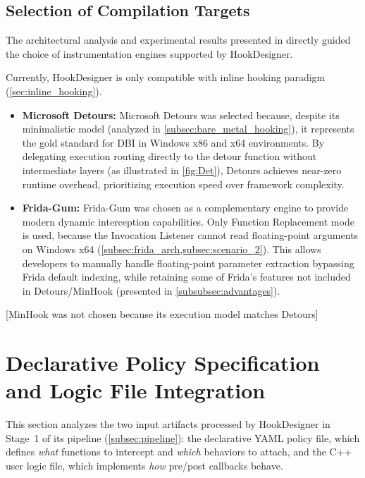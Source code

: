 \subsection{Selection of Compilation Targets}
\label{subsec:target_selection}

The architectural analysis and experimental results presented in  directly guided the choice of instrumentation engines supported by HookDesigner.

Currently, HookDesigner is only compatible with inline hooking paradigm (\cref{sec:inline_hooking}).

\begin{itemize}
	\item \textbf{Microsoft Detours:}
	Microsoft Detours was selected because, despite its minimalistic model (analyzed in \cref{subsec:bare_metal_hooking}), it represents the gold standard for \ac{DBI} in Windows x86 and x64 environments.
	By delegating execution routing directly to the detour function without intermediate layers (as illustrated in \cref{fig:Det}), Detours achieves near-zero runtime overhead, prioritizing execution speed over framework complexity. 
	
	\item \textbf{Frida-Gum:}
	Frida-Gum was chosen as a complementary engine to provide modern dynamic interception capabilities.
	Only Function Replacement mode is used, because the Invocation Listener cannot read floating-point arguments on Windows x64 (\cref{subsec:frida_arch,subsec:scenario_2}).
	This allows developers to manually handle floating-point parameter extraction bypassing Frida default indexing, while retaining some of Frida's features not included in Detours/MinHook (presented in \cref{subsubsec:advantages}).
\end{itemize}
[MinHook was not chosen because its execution model matches Detours]

\section{Declarative Policy Specification and Logic File Integration}
\label{sec:policy_dsl}

This section analyzes the two input artifacts processed by HookDesigner in Stage~1 of its pipeline (\cref{subsec:pipeline}): the declarative YAML policy file, which defines \emph{what} functions to intercept and \emph{which} behaviors to attach, and the C++ user logic file, which implements \emph{how} pre/post callbacks behave.

